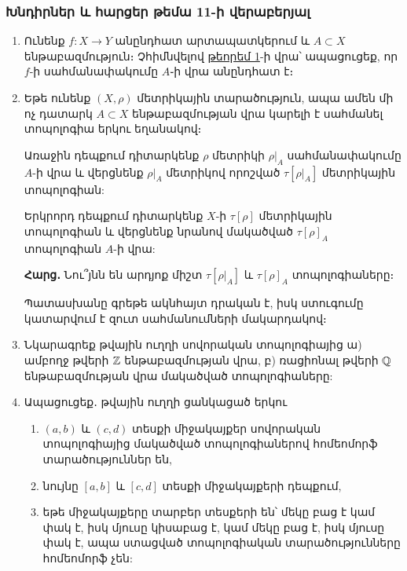 \bigskip
\bigskip
\subsubsection*{Խնդիրներ և հարցեր թեմա 11-ի վերաբերյալ}

\begin{enumerate}[label=\thesection.\arabic*.]

\item Ունենք $f : X \to Y$ անընդհատ արտապատկերում և $A \subset X$ են\-թա\-բազ\-մու\-թյուն։ Չհիմնվելով \hyperref[ch11thm1]{թեորեմ 1}-ի վրա՝ ապացուցեք, որ $f$-ի սահմանափակումը $A$֊ի վրա անընդհատ է։

\item Եթե ունենք $(X, \rho)$ մետրիկային տարածություն, ապա ամեն մի ոչ դատարկ $A \subset X$ ենթաբազմության վրա կարելի է սահմանել տոպոլոգիա երկու եղանա\-կով։
\par Առաջին դեպքում դիտարկենք $\rho$ մետրիկի $\left.\rho\right|_A$ սահմանափակումը $A$-ի վրա և վերցնենք $\left.\rho\right|_A$ մետրիկով որոշված $\tau[\left.\rho\right|_A]$ մետրիկային տոպոլոգիան:
\par Երկրորդ դեպքում դիտարկենք $X$-ի $\tau[\rho]$ մետրիկային տոպոլոգիան և վերցնենք նրանով մակածված $\tau[\rho]_A$ տոպոլոգիան $A$-ի վրա:
\par \textbf{Հարց․} Նու՞յնն են արդյոք միշտ $\tau[\left.\rho\right|_A]$ և $\tau[\rho]_A$ տոպոլոգիաները։

\begin{hint}
Պատասխանը գրեթե ակնհայտ դրական է, իսկ ստուգումը կա\-տար\-վում է զուտ սահմանումների մակարդակով։
\end{hint}

\item Նկարագրեք թվային ուղղի սովորական տոպոլոգիայից ա) ամբողջ թվերի $\mathbb{Z}$ են\-թա\-բազ\-մու\-թյան վրա, բ) ռացիոնալ թվերի $\mathbb{Q}$ ենթաբազմության վրա մակ\-ած\-ված տոպոլոգիաները:

\item Ապացուցեք․ թվային ուղղի ցանկացած երկու
\begin{enumerate}
    \item[ա)] $(a, b)$ և $(c, d)$ տեսքի միջակայքեր սովորական տոպոլոգիայից մակածված տոպոլոգիաներով հոմեոմորֆ տարածություններ են,
    \item[բ)] նույնը $[a, b]$ և $[c, d]$ տեսքի միջակայքերի դեպքում,
    \item[գ)] եթե միջակայքերը տարբեր տեսքերի են՝ մեկը բաց է կամ փակ է, իսկ մյուսը կիսաբաց է, կամ մեկը բաց է, իսկ մյուսը փակ է, ապա ստացված տոպոլոգիական տարածությունները հոմեոմորֆ չեն:
\end{enumerate}


\end{enumerate}
